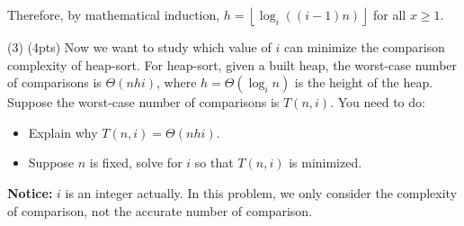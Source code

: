 \documentclass[10.5pt]{article}
\begin{document}
Therefore, by mathematical induction, $h = \left\lfloor\log_i((i-1)n)\right\rfloor$ for all $x\ge 1$.

\newpage
(3) (4pts) Now we want to study which value of $i$ can minimize the comparison complexity of heap-sort. For heap-sort, given a built heap, the worst-case number of comparisons is $\Theta(nhi)$, where $h=\Theta(\log_in)$ is the height of the heap. Suppose the worst-case number of comparisons is $T(n,i)$. You need to do: 

\begin{itemize}
	\item{Explain why $T(n,i) = \Theta(nhi)$.}
	\item{Suppose $n$ is fixed, solve for $i$ so that $T(n,i)$ is minimized.}
\end{itemize}

\textbf{Notice: } $i$ is an integer actually. In this problem, we only consider the complexity of comparison, not the accurate number of comparison.
\end{document}
